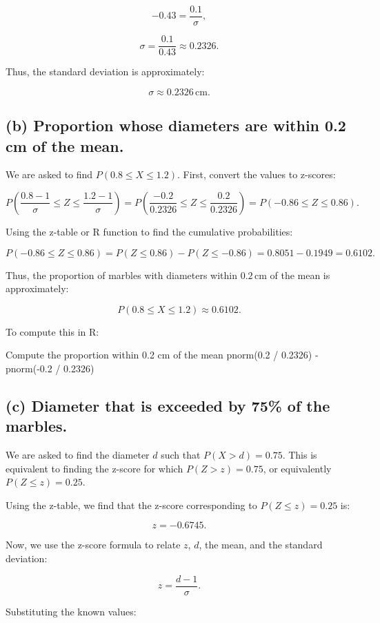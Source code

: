\documentclass{article} %
\begin{document}
\[
-0.43 = \frac{0.1}{\sigma},
\]

\[
\sigma = \frac{0.1}{0.43} \approx 0.2326.
\]

Thus, the standard deviation is approximately:

\[
\sigma \approx 0.2326 \, \text{cm}.
\]

\subsection*{(b) Proportion whose diameters are within 0.2 cm of the mean.}

We are asked to find \(P(0.8 \leq X \leq 1.2)\). First, convert the values to z-scores:

\[
P\left( \frac{0.8 - 1}{\sigma} \leq Z \leq \frac{1.2 - 1}{\sigma} \right)
= P\left( \frac{-0.2}{0.2326} \leq Z \leq \frac{0.2}{0.2326} \right)
= P(-0.86 \leq Z \leq 0.86).
\]

Using the z-table or R function to find the cumulative probabilities:

\[
P(-0.86 \leq Z \leq 0.86) = P(Z \leq 0.86) - P(Z \leq -0.86)
= 0.8051 - 0.1949 = 0.6102.
\]

Thus, the proportion of marbles with diameters within \(0.2 \, \text{cm}\) of the mean is approximately:

\[
P(0.8 \leq X \leq 1.2) \approx 0.6102.
\]

To compute this in R:

Compute the proportion within 0.2 cm of the mean
pnorm(0.2 / 0.2326) - pnorm(-0.2 / 0.2326)

\subsection*{(c) Diameter that is exceeded by 75\% of the marbles.}

We are asked to find the diameter \( d \) such that \( P(X > d) = 0.75 \). This is equivalent to finding the z-score for which \( P(Z > z) = 0.75 \), or equivalently \( P(Z \leq z) = 0.25 \). 

Using the z-table, we find that the z-score corresponding to \( P(Z \leq z) = 0.25 \) is:

\[
z = -0.6745.
\]

Now, we use the z-score formula to relate \( z \), \( d \), the mean, and the standard deviation:

\[
z = \frac{d - 1}{\sigma}.
\]

Substituting the known values:
\end{document}
